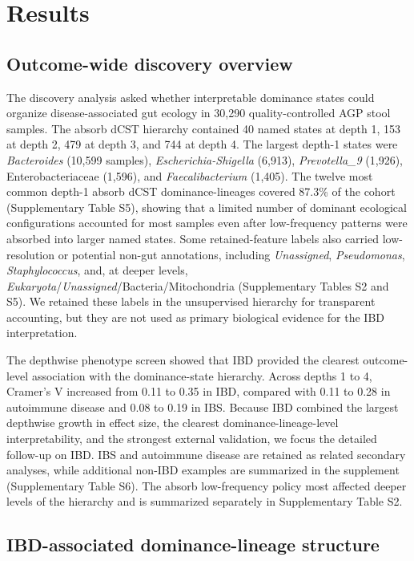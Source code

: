 \documentclass[
  11pt,
]{article}
\newcommand{\taxon}[1]{\emph{#1}}
\begin{document}
\section{Results}\label{cohort-overview}

\subsection{Outcome-wide discovery overview}\label{outcome-wide-discovery-overview}

The discovery analysis asked whether interpretable dominance states
could organize disease-associated gut ecology in 30,290
quality-controlled AGP stool samples. The absorb dCST hierarchy
contained 40 named states at depth 1, 153 at depth 2, 479 at depth 3,
and 744 at depth 4. The largest depth-1 states were
\taxon{Bacteroides} (10,599 samples),
\taxon{Escherichia-Shigella} (6,913), \taxon{Prevotella\_9} (1,926),
Enterobacteriaceae (1,596), and \taxon{Faecalibacterium} (1,405). The
twelve most common depth-1 absorb dCST dominance-lineages covered 87.3\% of the cohort
(Supplementary Table S5), showing that a limited number of dominant
ecological configurations accounted for most samples even after
low-frequency patterns were absorbed into larger named states. Some
retained-feature labels also carried low-resolution or potential non-gut
annotations, including
\emph{Unassigned}, \taxon{Pseudomonas}, \taxon{Staphylococcus}, and, at
deeper levels, \emph{Eukaryota}/\emph{Unassigned}/Bacteria/Mitochondria
(Supplementary Tables S2 and S5). We retained these labels in the
unsupervised hierarchy for transparent accounting, but they are not used
as primary biological evidence for the IBD interpretation.

The depthwise phenotype screen showed that IBD provided the clearest
outcome-level association with the dominance-state hierarchy. Across depths 1 to 4, Cramer's V increased from
0.11 to 0.35 in IBD, compared with 0.11 to 0.28 in autoimmune disease
and 0.08 to 0.19 in IBS. Because IBD combined the largest depthwise
growth in effect size, the clearest dominance-lineage-level
interpretability, and the strongest external validation, we focus the
detailed follow-up on IBD. IBS and autoimmune disease are retained as
related secondary analyses, while additional non-IBD examples are
summarized in the supplement (Supplementary Table S6). The absorb
low-frequency policy most affected deeper levels of the hierarchy and is
summarized separately in Supplementary Table S2.

\subsection{IBD-associated dominance-lineage structure}\label{ibd-associated-dominance-lineage-structure}
\end{document}

